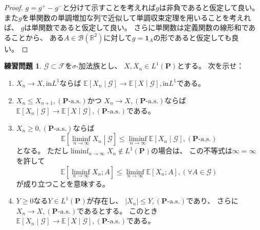 \documentclass[uplatex]{jsarticle}
\theoremstyle{definition}
\newtheorem{prob}[prob]{練習問題}
\def\R{\mathbb{R}}
\def\P{\mathbf{P}}
\def\E{\mathbb{E}}
\def\I{\mathbf{1}}
\def\mcB{\mathcal{B}}
\def\mcF{\mathcal{F}}
\def\mcG{\mathcal{G}}
\begin{document}
\begin{proof}
  \(g=g^+-g^-\)と分けて示すことを考えれば\(g\)は非負であると仮定して良い。
  また\(g\)を単関数の単調増加な列で近似して単調収束定理を用いることを考えれば、
  \(g\)は単関数であると仮定して良い。
  さらに単関数は定義関数の線形和であることから、
  ある\(A\in \mcB(\R^2)\)に対して\(g = \I_A\)の形であると仮定しても良い。

\end{proof}














\begin{prob}\label{prob: 1.8}
  \(\mcG\subset \mcF\)を\(\sigma\)-加法族とし、
  \(X,X_n\in L^1(\P)\)とする。
  次を示せ：
  \begin{enumerate}
    \item \label{enumi: prob: 1.8-1}
    \(X_n \to X, \text{in} L^1\)ならば
    \(\E\left[X_n\middle|\mcG\right] \to \E\left[X\middle|\mcG\right]
    , \text{in} L^1\)である。
    \item \label{enumi: prob: 1.8-2}
    \(X_n\leq X_{n+1}, (\P\text{-a.s.})\)かつ
    \(X_n\to X, (\P\text{-a.s.})\)ならば
    \(\E\left[X_n\middle|\mcG\right] \to \E\left[X\middle|\mcG\right],
    (\P\text{-a.s.})\)である。
    \item \label{enumi: prob: 1.8-3}
    \(X_n \geq 0, (\P\text{-a.s.})\)ならば
    \[
    \E\left[ \liminf_{n\to \infty} X_n\middle|\mcG \right]
    \leq \liminf_{n\to \infty}\E\left[X_n\middle|\mcG\right],
    (\P\text{-a.s.})
    \]
    となる。
    ただし\(\liminf_{n\to \infty} X_n\not\in L^1(\P)\)の場合は、
    この不等式は\(\infty = \infty\)を許して
    \[
    \E\left[ \liminf_{n\to \infty} X_n; A \right]
    \leq \liminf_{n\to \infty}\E\left[X_n; A\right],
    (\forall A\in\mcG)
    \]
    が成り立つことを意味する。
    \item \label{enumi: prob: 1.8-4}
    \(Y\geq 0\)なる\(Y\in L^1(\P)\)が存在し、
    \(|X_n| \leq Y , (\P\text{-a.s.})\)であり、
    さらに\(X_n\to X, (\P\text{-a.s.})\)であるとする。
    このとき
    \(\E\left[X_n\middle|\mcG\right] \to \E\left[X\middle|\mcG\right],
    (\P\text{-a.s.})\)である。
  \end{enumerate}
\end{prob}
\end{document}
